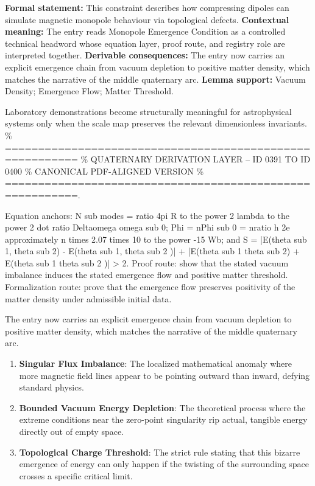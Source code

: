 \begingroup\footnotesize\setlength{\emergencystretch}{3em}\sloppy
\textbf{Formal statement:} This constraint describes how compressing dipoles can simulate magnetic monopole behaviour via topological defects. \textbf{Contextual meaning:} The entry reads Monopole Emergence Condition as a controlled technical headword whose equation layer, proof route, and registry role are interpreted together. \textbf{Derivable consequences:} The entry now carries an explicit emergence chain from vacuum depletion to positive matter density, which matches the narrative of the middle quaternary arc. \textbf{Lemma support:} Vacuum Density; Emergence Flow; Matter Threshold.\par
\endgroup

Laboratory demonstrations become structurally meaningful for astrophysical systems only when the scale map preserves the relevant dimensionless invariants. \% ========================================================= \% QUATERNARY DERIVATION LAYER -- ID 0391 TO ID 0400 \% CANONICAL PDF-ALIGNED VERSION \% =========================================================.

Equation anchors: N sub modes = ratio 4pi R to the power 2 lambda to the power 2 dot ratio Deltaomega omega sub 0; Phi = nPhi sub 0 = nratio h 2e approximately n times 2.07 times 10 to the power -15 Wb; and S = |E(theta sub 1, theta sub 2) - E(theta sub 1, theta sub 2 )| + |E(theta sub 1 theta sub 2) + E(theta sub 1 theta sub 2 )| > 2. Proof route: show that the stated vacuum imbalance induces the stated emergence flow and positive matter threshold. Formalization route: prove that the emergence flow preserves positivity of the matter density under admissible initial data.

The entry now carries an explicit emergence chain from vacuum depletion to positive matter density, which matches the narrative of the middle quaternary arc.
\endgroup

\begin{enumerate}[leftmargin=1.6em,itemsep=6pt,topsep=4pt]
\item \textbf{Singular Flux Imbalance}: The localized mathematical anomaly where more magnetic field lines appear to be pointing outward than inward, defying standard physics.
\item \textbf{Bounded Vacuum Energy Depletion}: The theoretical process where the extreme conditions near the zero-point singularity rip actual, tangible energy directly out of empty space.
\item \textbf{Topological Charge Threshold}: The strict rule stating that this bizarre emergence of energy can only happen if the twisting of the surrounding space crosses a specific critical limit.
\end{enumerate}

